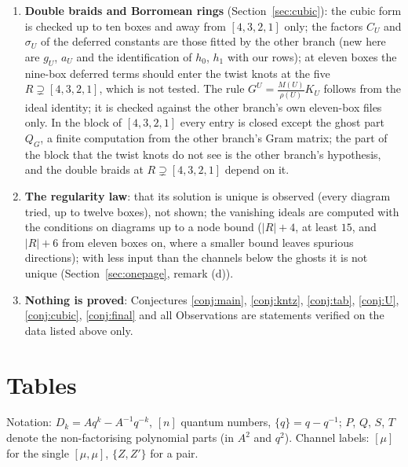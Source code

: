 \documentclass[11pt]{article}
\begin{document}
\begin{enumerate}
three rows with a gap at most two or $s_3=3$, not in general; for three corners the leading part of the ghost is closed
(Section~\ref{sec:ghosts}).
\item \textbf{Double braids and Borromean rings} (Section~\ref{sec:cubic}): the cubic form is checked up to ten boxes
and away from $[4,3,2,1]$ only; the factors $C_U$ and $\sigma_U$ of the deferred constants are those fitted by the other
branch (new here are $g_U$, $a_U$ and the identification of $h_0$, $h_1$ with our rows); at eleven boxes the nine-box
deferred terms should enter the twist knots at the five $R\supsetneq[4,3,2,1]$, which is not tested.  The rule
$G^U=\frac{M(U)}{\rho(U)}K_U$ follows from the ideal identity; it is checked against the other branch's own eleven-box
files only.  In the block of $[4,3,2,1]$ every entry is closed except the ghost part $Q_G$, a finite computation
from the other branch's Gram matrix; the part of the block that the twist knots do not see is the other branch's
hypothesis, and the double braids at $R\supsetneq[4,3,2,1]$ depend on it.
\item \textbf{The regularity law}: that its solution is unique is observed (every diagram tried, up to twelve boxes),
not shown; the vanishing ideals are computed with the conditions on diagrams up to a node bound ($|R|+4$, at least
$15$, and $|R|+6$ from eleven boxes on, where a smaller bound leaves spurious directions); with less input than the
channels below the ghosts it is not unique (Section~\ref{sec:onepage}, remark (d)).
\item \textbf{Nothing is proved}: Conjectures \ref{conj:main}, \ref{conj:kntz}, \ref{conj:tab}, \ref{conj:U},
\ref{conj:cubic}, \ref{conj:final} and all Observations are statements verified on the data listed above only.
\end{enumerate}

\appendix
\section{Tables}

Notation: $D_k=Aq^k-A^{-1}q^{-k}$, $[n]$ quantum numbers, $\{q\}=q-q^{-1}$; $P$, $Q$, $S$, $T$ denote the
non-factorising polynomial parts (in $A^2$ and $q^2$).  Channel labels: $[\mu]$ for the single $[\mu,\mu]$,
$\{Z,Z'\}$ for a pair.
\end{document}
